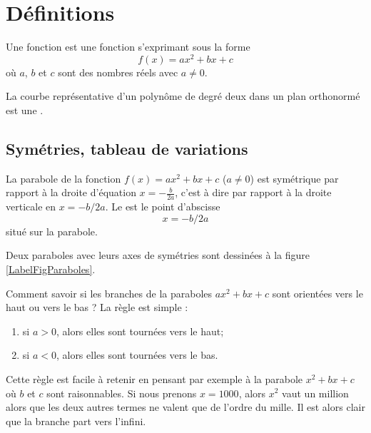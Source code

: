 
\section{Définitions}

\begin{definition}
    Une fonction  est une fonction s'exprimant sous la forme 
    \begin{equation}
    f(x)=ax^2+bx+c
    \end{equation}
    où \( a\), \( b\) et \( c\) sont des nombres réels avec \( a\neq 0\). 
    
    La courbe représentative d'un polynôme de degré deux dans un plan orthonormé est une .
\end{definition}

\subsection{Symétries, tableau de variations}

La parabole de la fonction \( f(x)=ax^2+bx+c\) (\( a\neq 0\)) est symétrique par rapport à la droite d'équation \( x=-\frac{ b }{ 2a }\), c'est à dire par rapport à la droite verticale en \( x=-b/2a\). Le  est le point d'abscisse 
\begin{equation}
x=-b/2a
\end{equation}
situé sur la parabole.

Deux paraboles avec leurs axes de symétries sont dessinées à la figure \ref{LabelFigParaboles}.
\newcommand{\CaptionFigParaboles}{Deux paraboles}


Comment savoir si les branches de la paraboles \( ax^2+bx+c\) sont orientées vers le haut ou vers le bas ? La règle est simple : 
\begin{enumerate}
    \item
        si \( a>0\), alors elles sont tournées vers le haut;
    \item
        si \( a<0\), alors elles sont tournées vers le bas.
\end{enumerate}
Cette règle est facile à retenir en pensant par exemple à la parabole \( x^2+bx+c\) où \( b\) et \( c\) sont raisonnables. Si nous prenons \( x=1000\), alors \( x^2\) vaut un million alors que les deux autres termes ne valent que de l'ordre du mille. Il est alors clair que la branche part vers l'infini.

